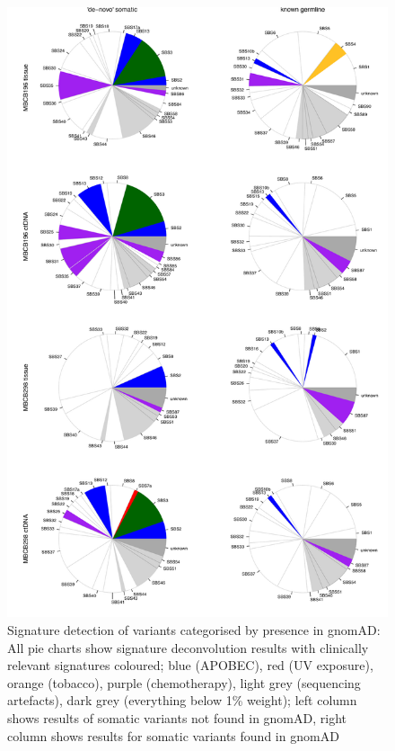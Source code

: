 \begin{figure}[ht]
\centering
\includegraphics[height=.89\textheight]{Figures/MisMatchFinder/signaturesGermlineSplit.pdf}
\caption[Signature detection of variants categorised by presence in gnomAD]{Signature detection of variants categorised by presence in gnomAD: All pie charts show signature deconvolution results with clinically relevant signatures coloured; blue (APOBEC), red (UV exposure), orange (tobacco), purple (chemotherapy), light grey (sequencing artefacts), dark grey (everything below 1\% weight); left column shows results of somatic variants not found in gnomAD, right column shows results for somatic variants found in gnomAD}\label{A:fig:signaturesGermlineSplit}
\end{figure}


